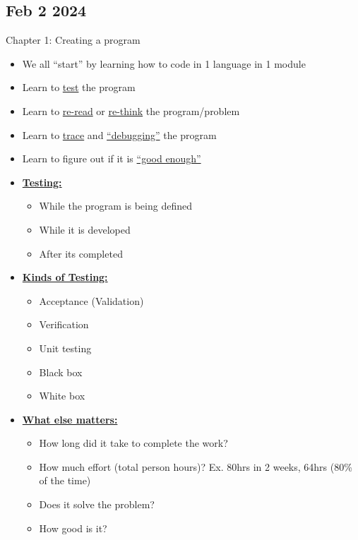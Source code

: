 \documentclass[12pt]{article}
\begin{document}
\subsection*{Feb 2 2024}

Chapter 1: Creating a program

\begin{itemize}
		  \item We all ``start'' by learning how to code in 1 language in 1 module
		  \item Learn to \underline{test} the program
		  \item Learn to \underline{re-read} or \underline{re-think} the program/problem
		  \item Learn to \underline{trace} and  \underline{``debugging''} the program
		  \item Learn to figure out if it is \underline{``good enough''}
		  \item \textbf{\underline{Testing:}}
					 \begin{itemize}
								\item While the program is being defined
								\item While it is developed
								\item After its completed
					 \end{itemize}
		  \item \textbf{\underline{Kinds of Testing:}}
					 \begin{itemize}
								\item Acceptance (Validation) 
								\item Verification
								\item Unit testing
								\item Black box
								\item White box
					 \end{itemize}
		  \item \textbf{\underline{What else matters:}}
					 \begin{itemize}
								\item How long did it take to complete the work? 
								\item How much effort (total person hours)? 
										  Ex. 80hrs in 2 weeks, 64hrs (80\% of the time)
								\item Does it solve the problem?
								\item How good is it?
					 \end{itemize}
\end{itemize}
\end{document}
